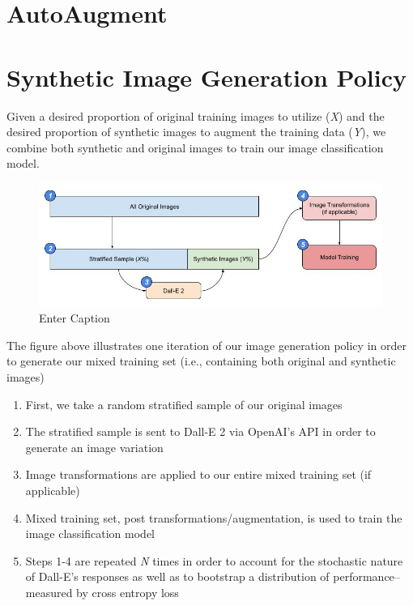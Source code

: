 \documentclass [MS] {uclathes}
\begin{document}
\section{AutoAugment}

\section{Synthetic Image Generation Policy}
Given a desired proportion of original training images to utilize (\textit{X}) and the desired proportion of synthetic 
images to augment the training data (\textit{Y}), we combine both synthetic and original images to train our image 
classification model. 

\begin{figure} [h]
    \centering
    \includegraphics[width=1\linewidth]{figures/image_generation_policy.jpg}
    \caption{Enter Caption}
    \label{fig:enter-label}
\end{figure}

The figure above illustrates one iteration of our image generation policy in order to generate our mixed training set 
(i.e., containing both original and synthetic images)
\begin{enumerate}
    \item First, we take a random stratified sample of our original images
    \item The stratified sample is sent to Dall-E 2 via OpenAI's API in order to generate an image variation
    \item Image transformations are applied to our entire mixed training set (if applicable)
    \item Mixed training set, post transformations/augmentation, is used to train the image classification model
    \item Steps 1-4 are repeated \textit{N} times in order to account for the stochastic nature of Dall-E's responses as 
    well as to bootstrap a distribution of performance--measured by cross entropy loss
\end{enumerate}
\end{document}
